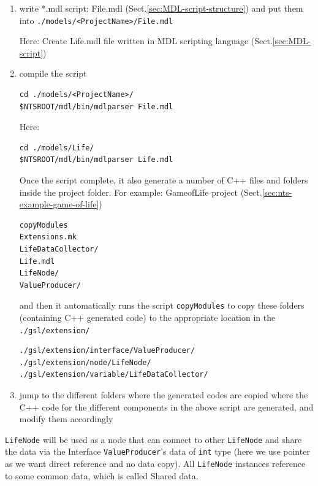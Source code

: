 \begin{enumerate}
  
  \item write *.mdl script: File.mdl (Sect.\ref{sec:MDL-script-structure})
 and put them into \verb!./models/<ProjectName>/File.mdl!
  
Here: Create Life.mdl file written in MDL scripting language
  (Sect.\ref{sec:MDL-script})

  
  \item compile the script

\begin{verbatim}
cd ./models/<ProjectName>/
$NTSROOT/mdl/bin/mdlparser File.mdl
\end{verbatim}  
  
Here:
\begin{verbatim}
cd ./models/Life/
$NTSROOT/mdl/bin/mdlparser Life.mdl
\end{verbatim}  
Once the script complete, it also generate a number of C++ files and folders
inside the project folder. For example: GameofLife project
(Sect.\ref{sec:nts-example-game-of-life})

\begin{verbatim}
copyModules  
Extensions.mk  
LifeDataCollector/  
Life.mdl  
LifeNode/  
ValueProducer/
\end{verbatim}

and then it automatically runs the script \verb!copyModules! to copy these
folders (containing C++ generated code) to the appropriate location in the \verb!./gsl/extension/!
\begin{verbatim}
./gsl/extension/interface/ValueProducer/
./gsl/extension/node/LifeNode/
./gsl/extension/variable/LifeDataCollector/
\end{verbatim}
  
  \item jump to the different folders where the generated codes are copied where
  the C++ code for the different components in the above script are generated, and modify them accordingly
  
\end{enumerate}


\verb!LifeNode! will be used as a node that can connect to other \verb!LifeNode!
and share the data via the Interface \verb!ValueProducer!'s data of \verb!int!
type (here we use pointer as we want direct reference and no data copy).
All \verb!LifeNode! instances reference to some common data, which is called
Shared data. 

